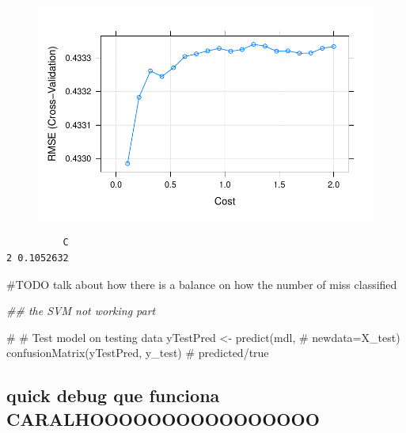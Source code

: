 \documentclass[
  letterpaper,
  DIV=11,
  numbers=noendperiod]{scrartcl}
\newenvironment{Shaded}{\begin{snugshade}}{\end{snugshade}}
\newcommand{\CommentTok}[1]{\textcolor[rgb]{0.37,0.37,0.37}{#1}}
\newcommand{\DocumentationTok}[1]{\textcolor[rgb]{0.37,0.37,0.37}{\textit{#1}}}
\newcommand{\NormalTok}[1]{\textcolor[rgb]{0.00,0.23,0.31}{#1}}
\newcommand{\SpecialCharTok}[1]{\textcolor[rgb]{0.37,0.37,0.37}{#1}}
\begin{document}
\begin{figure}[H]

{\centering \includegraphics{AssignmentAdvancedTopicsInStatistics_files/figure-pdf/unnamed-chunk-22-1.pdf}

}

\end{figure}

\begin{Shaded}
\end{Shaded}

\begin{verbatim}
          C
2 0.1052632
\end{verbatim}

\#TODO talk about how there is a balance on how the number of miss
classified

\begin{Shaded}
\begin{Highlighting}[]
\DocumentationTok{\#\# the SVM not working part}

\CommentTok{\# \# Test model on testing data yTestPred \textless{}{-} predict(mdl,}
\CommentTok{\# newdata=X\_test) confusionMatrix(yTestPred, y\_test) \# predicted/true}
\end{Highlighting}
\end{Shaded}

\hypertarget{quick-debug-que-funciona-caralhoooooooooooooooo}{%
\subsection{quick debug que funciona
CARALHOOOOOOOOOOOOOOOO}\label{quick-debug-que-funciona-caralhoooooooooooooooo}}
\end{document}
